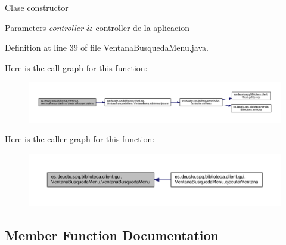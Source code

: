 Clase constructor 
\begin{DoxyParams}{Parameters}
{\em controller} & controller de la aplicacion \\
\hline
\end{DoxyParams}


Definition at line 39 of file Ventana\+Busqueda\+Menu.\+java.

Here is the call graph for this function\+:
\nopagebreak
\begin{figure}[H]
\begin{center}
\leavevmode
\includegraphics[width=350pt]{classes_1_1deusto_1_1spq_1_1biblioteca_1_1client_1_1gui_1_1_ventana_busqueda_menu_a658523d6f90443c42cab22ed93ebede8_cgraph}
\end{center}
\end{figure}
Here is the caller graph for this function\+:
\nopagebreak
\begin{figure}[H]
\begin{center}
\leavevmode
\includegraphics[width=350pt]{classes_1_1deusto_1_1spq_1_1biblioteca_1_1client_1_1gui_1_1_ventana_busqueda_menu_a658523d6f90443c42cab22ed93ebede8_icgraph}
\end{center}
\end{figure}


\subsection{Member Function Documentation}
\mbox{\label{classes_1_1deusto_1_1spq_1_1biblioteca_1_1client_1_1gui_1_1_ventana_busqueda_menu_a3680f3f4268980870f82f8a2c1a02890}} 
